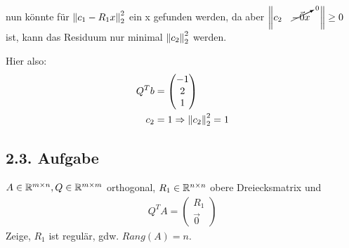 nun könnte für $\left\lVert c_1 -R_1x\right\rVert_2^2$ ein x gefunden werden, da aber $\left\lVert c_2 \quad\cancelto{0}{-\vec{0}x}\quad\right\rVert \geq 0$ ist, kann das Residuum nur minimal $\left\lVert c_2\right\rVert_2^2$ werden.

Hier also:
\begin{equation}\begin{split}
	Q^Tb &= \begin{pmatrix}
		-1\\2\\1
	\end{pmatrix}\\
	c_2 &= 1 \Rightarrow
	\left\lVert c_2\right\rVert_2^2 = 1
\end{split}\end{equation}



\subsection*{2.3. Aufgabe}
$A\in {\mathbb R}^{m\times n}, Q \in {\mathbb R}^{m\times m}$ orthogonal, $R_1\in {\mathbb R}^{n\times n}$ obere Dreiecksmatrix und
\begin{equation}\begin{split}
	Q^TA = \begin{pmatrix}
		R_1\\\vec{0}
	\end{pmatrix}
\end{split}\end{equation}
Zeige, $R_1$ ist regulär, gdw. $Rang(A) = n$.



















